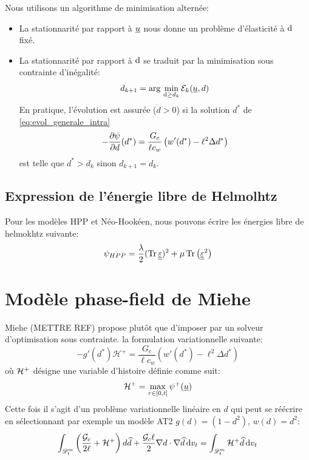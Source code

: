 \documentclass[10pt]{book}
\newcommand{\Gc}{\Gg_{c}}
\begin{document}
Nous utilisons un algorithme de minimisation alternée:
\begin{itemize}[label=-]
\item La stationnarité par rapport à $\underline{u}$ nous donne un problème d'élasticité à $\mathrm{d}$ fixé.
\item La stationnarité par rapport à $\mathrm{d}$ se traduit par la minimisation sous contrainte d'inégalité:
\begin{equation}
d_{k+1}= \mathrm{arg}\,\min_{\mathrm{d} \geq d_{k}} \mathcal{E}_{k}(\underline{u},d)
\label{eq:minimisation_intralam_d}
\end{equation}
En pratique, l'évolution est assurée ($\dot{d}>0$) si la solution $d^{*}$ de \eqref{eq:evol_generale_intra}
\begin{equation}
-\dfrac{\partial \psi}{\partial d}(d^{*})=\dfrac{G_{c}}{\ell c_{w}}\left(w'(d^{*})-\ell^{2}\Delta d^{*}\right)
\label{eq:evol_generale_intra}
\end{equation}
est telle que $d^{*}>d_{k}$ sinon $d_{k+1}=d_{k}$.
\end{itemize}
\subsection{Expression de l'énergie libre de Helmolhtz}
Pour les modèles HPP et Néo-Hookéen, nous pouvons écrire les énergies libre de helmokhtz suivante:
$$\psi_{HPP}=\dfrac{\lambda}{2}(\tr\DefoHPP)^{2}+\mu\tr\left(\DefoHPP^{2}\right)$$
\section{Modèle phase-field de Miehe}
Miehe (METTRE REF) propose plutôt que d'imposer par un solveur d'optimisation sous contrainte. la formulation variationnelle suivante:
$$-g'(d^{*})\mathcal{H}^{+}=\dfrac{G_{c}}{\ell c_{w}}\left(w'(d^{*})-\ell^{2}\Delta d^{*}\right)$$
où $\mathcal{H}^{+}$ désigne une variable d'histoire définie comme suit:
$$\mathcal{H}^{+}=\max_{\tau\in[0,t]}\psi^{+}(\underline{u})$$
Cette fois il s'agit d'un problème variationnelle linéaire en $d$ qui peut se réécrire en sélectionnant par exemple un modèle AT2 $g(d)=(1-d^{2})$, $w(d)=d^{2}$:
$$\int_{\Dmt}\left(\dfrac{\Gc}{2\ell}+\Hh^{+}\right)d\hat{d}+\dfrac{\Gc\ell}{2}\nabla d\cdot\nabla\hat{d}\dvt = \int_{\Dmt}\Hh^{+}\hat{d}\dvt$$
\end{document}
